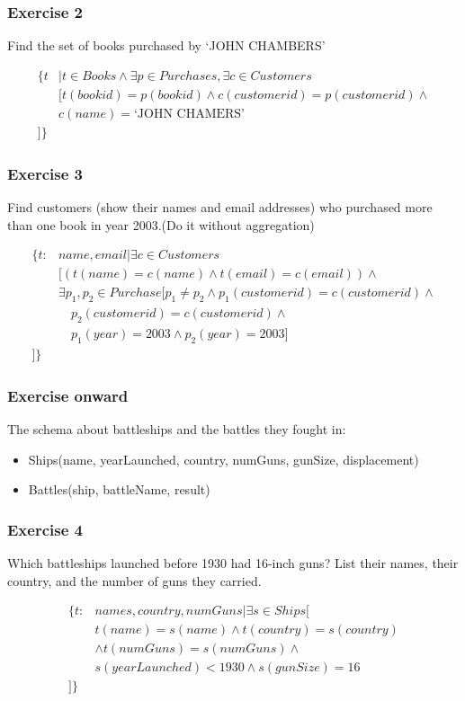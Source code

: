 \documentclass{beamer}
\begin{document}
\begin{frame}[fragile]
\frametitle{Exercise 2}
Find the set of books purchased by  `JOHN CHAMBERS'

\begin{align*}
\{t&|t\in Books\wedge \exists p \in Purchases, \exists c \in Customers \\
&[t(bookid)=p(bookid) \wedge c(customerid)=p(customerid) \wedge \\
&c(name)=\text{`JOHN CHAMERS'}\\
]\}
\end{align*}


\end{frame}

\begin{frame}[fragile]
\frametitle{Exercise 3}
Find customers (show their names and email addresses) who purchased more than one book in year 2003.(Do it without aggregation) 

\begin{align*}
\{t: &name, email| \exists c \in Customers \\
&[(t(name)=c(name)\wedge t(email)=c(email)) \wedge \\
& \exists p_1,p_2 \in Purchase [p_1\neq p_2 \wedge p_1(customerid)=c(customerid) \wedge \\ 
&\quad p_2(customerid)=c(customerid) \wedge \\
&\quad p_1(year)=2003 \wedge p_2(year)=2003]\\
]\}
\end{align*}
\end{frame}


\begin{frame}[fragile]
\frametitle{Exercise onward}
The schema about battleships and the battles they fought in:
\begin{itemize}
\item Ships(name, yearLaunched, country, numGuns, gunSize, displacement)
\item Battles(ship, battleName, result)
\end{itemize}
\end{frame}

\begin{frame}[fragile]
\frametitle{Exercise 4}
Which battleships launched before 1930 had 16-inch guns? List their names, their country, and the number of guns they carried.

\begin{align*}
\{t:& names, country, numGuns|\exists s\in Ships[ \\
& t(name)=s(name) \wedge t(country)=s(country) \\ 
& \wedge  t(numGuns)=s(numGuns)\wedge \\
&s(yearLaunched)<1930 \wedge s(gunSize)=16\\
]\}
\end{align*}
\end{frame}
\end{document}
